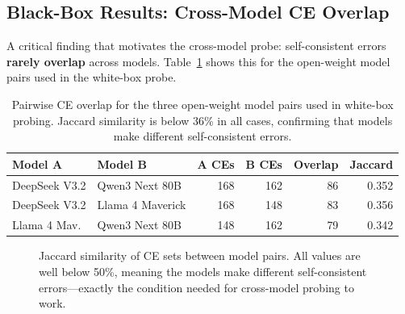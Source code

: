 \documentclass[11pt]{article}
\begin{document}
\subsection{Black-Box Results: Cross-Model CE Overlap}

A critical finding that motivates the cross-model probe: self-consistent errors \textbf{rarely overlap} across models. Table~\ref{tab:overlap} shows this for the open-weight model pairs used in the white-box probe.

\begin{table}[H]
\centering
\begin{tabular}{llrrrr}
\toprule
\textbf{Model A} & \textbf{Model B} & \textbf{A CEs} & \textbf{B CEs} & \textbf{Overlap} & \textbf{Jaccard} \\
\midrule
DeepSeek V3.2   & Qwen3 Next 80B      & 168 & 162 & 86 & 0.352 \\
DeepSeek V3.2   & Llama 4 Maverick     & 168 & 148 & 83 & 0.356 \\
Llama 4 Mav.    & Qwen3 Next 80B       & 148 & 162 & 79 & 0.342 \\
\bottomrule
\end{tabular}
\caption{Pairwise CE overlap for the three open-weight model pairs used in white-box probing. Jaccard similarity is below 36\% in all cases, confirming that models make different self-consistent errors.}
\label{tab:overlap}
\end{table}

\begin{figure}[H]
\centering
{}
\caption{Jaccard similarity of CE sets between model pairs. All values are well below 50\%, meaning the models make different self-consistent errors---exactly the condition needed for cross-model probing to work.}
\label{fig:jaccard}
\end{figure}
\end{document}
